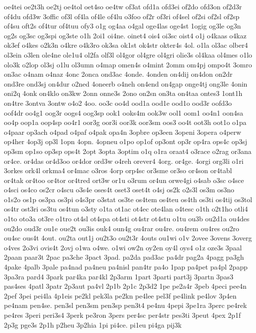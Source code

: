 {oe4tei
oe2t3h
oe2tj
oe4tol
oet4so
oe4tw
of3at
ofd1a
ofd3ei
of2do
ofd3on
of2d3r
of4du
ofd3w
3offic
of3l
of4la
of4le
of4lu
o3foo
of2r
of3ri
of4sel
of2si
of2sl
of2sp
of4su
oft2s
of4tur
of4tuu
ofy3
o1g
og4aa
o4gal
oge4las
oge4st
1ogig
og3le
og3n
og2s
og3sc
og3spi
og3ste
o1h
2oi1
oi4ne.
oinet4
ois4
oi3sc
oist4
o1j
o4kaas
o4kaz
ok3ef
o4kes
o2k3n
o4kre
o4k3ro
ok3sa
ok1st
ok4str
okter4s
4ol.
o1la
ol3ac
olber4
ol3ein
o3len
ole4ne
ole1u4
ol2fa
olf3l
ol4gor
ol4gre
ol4gri
olie3s
ol4kaa
ol4mes
o1lo
olo3k
o2lop
ol3sj
o1lu
ol3umn
o4map
omen4s
o4mint
2omm
om4pj
ompo4t
3omro
on3ac
o4nam
o4naz
4onc
2onca
ond3ac
4onde.
4onden
on4dij
on4don
on2dr
ond3re
ond3sj
on4dur
o2ned
4oneerb
o4neh
on4end
on4gap
onge4tj
ong3le
4onin
oni2q
4onk
on4klo
on3kw
2onn
onne3s
2ono
on2sn
on3ta
on4taa
ontes3
1ont1h
on4tre
3ontva
3ontw
o4o2
4oo.
oo3c
oo4d
ood1a
ood1e
ood1o
ood3r
oofd3o
oof4dr
oo4g1
oog3r
oogs4
oog3sp
ook1
ooks4m
ook3w
ool1
oom1
oo4n1
oon4sa
oo4p
oop1a
oop4sp
oo4r1
oor3g
oor3i
oor3k
oor3sm
oos3
oo4t
oot3h
oot1o
o1pa
o4paar
op3ach
o4pad
o4paf
o4pak
opa4n
3opbre
op3een
3openi
3opera
o4perw
op4her
4op3j
op3l
1opn
4opn.
4opneu
o1po
op1of
op3ont
op3r
op4ra
ops4c
op3sj
op3sm
op1so
op3sp
ops4t
2opt
3opta
3optim
o1q
o1ra
oraat4
o3race
o2rag
or3ana
or4ce.
or4das
or4d3oo
or4dor
ord3w
o4reh
orever4
4org.
or4ge.
4orgi
org3li
o1ri
3orkes
ork4l
orkma4
or4mac
o3ros
4orp
orp4sc
or3sme
or3so
or4son
or4tabl
or4tak
or4too
or4tor
or4tred
ort3w
or1u
o3rum
or4un
orwe4gi
o4sab
o3sc
o4sce
o4sci
os4co
os2cr
o4scu
o3s4e
oses4t
oset3
oset4t
o4sj
os2k
o2s3l
os3m
os3no
o1s2o
os1p
os3pa
os3pi
o4s3pr
o3stat
os3te
os4tem
os4teu
os4th
os3ti
os4tij
os3tol
os4tr
ost3ri
os3tu
os4tun
o3sty
o1ta
ot1ac
ot4ec
ote4lan
o4tesc
o1th
o2t1ho
otli4
o1to
oto3a
ot3re
o1tro
ot4sl
ot4spa
ot4sti
ot4str
ot4stu
o1tu
ou3b
ou2d1a
ou4des
ou2do
oud3r
ou1e
oue2t
ou3is
ouk4
oun4g
ou4rar
ou4re.
ou4rem
ou4res
ou2ro
ou4sc
ous4t
4out.
ou2ta
out1j
ou2t3o
ou2t3r
4outs
ou1wi
o1v
2ovee
3ovens
3overg
o4ves
2o3vi
ovis4t
2ovj
o1wa
o4we.
o1wi
ow2n
oy2en
oy4l
oys4
o1z
oze3s
3paal
2paan
paar3t
2pac
pa3che
3pact
3pad.
pa2da
pad3ac
pa4dr
pag2a
4pagg
pa3gh
4pake
4palb
3pale
pa4nad
pa4neu
pa4nisl
pan4tr
pa4o
1pap
pa4pet
pa4pl
2papp
3pa3ra
pard4
3park
par4ka
par4kl
2p3arm
1part
3parti
part3j
3partn
3pas3
pas4ses
4patl
3patr
2p3aut
pa4vl
2p1b
2p1c
2p3d2
1pe
pe2a4r
3peb
4peci
pee4n
2pef
3pei
pei4la
4p1eis
pe2kl
pek3la
pe2kn
pe4lee
pel3f
pe4link
pe4lov
3p4en
pe4nam
pen4se.
pen3sl
pen3sm
pen3sp
pen3t4
pe4nu
4pepi
3pe1ra
3perc
pe4rek
pe4res
3peri
peri3s4
3perk
pe3ron
3pers
per4sc
per4str
pes3ti
3peut
4pex
2p1f
2p3g
pge3s
2p1h
p2heu
3p2hia
1pi
pi4ce.
pi1eu
pi4ga
pij3k
}
